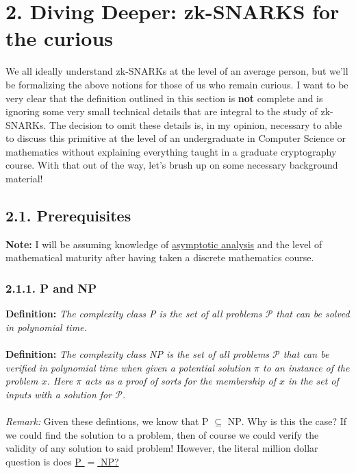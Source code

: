 \documentclass{article}
\begin{document}
\section*{2. Diving Deeper: zk-SNARKS for the curious}
We all ideally understand zk-SNARKs at the level of an average person, but we'll be formalizing the above notions for those of us who remain curious. I want to be very clear that the definition outlined in this section is \textbf{not} complete and is ignoring some very small technical details that are integral to the study of zk-SNARKs. The decision to omit these details is, in my opinion, necessary to able to discuss this primitive at the level of an undergraduate in Computer Science or mathematics without explaining everything taught in a graduate cryptography course. With that out of the way, let's brush up on some necessary background material!
\subsection*{2.1. Prerequisites}
\textbf{Note:} I will be assuming knowledge of \href{https://en.wikipedia.org/wiki/Asymptotic_analysis}{asymptotic analysis} and the level of mathematical maturity after having taken a discrete mathematics course.

\subsubsection*{2.1.1. \textsc{P} and \textsc{NP}}
\textbf{Definition:} \textit{The complexity class \textsc{P} is the set of all problems $\mathcal{P}$ that can be solved in polynomial time.} \\ \\
\textbf{Definition:} \textit{The complexity class \textsc{NP} is the set of all problems $\mathcal{P}$ that can be verified in polynomial time when given a potential solution $\pi$ to an instance of the problem $x$. Here $\pi$ acts as a proof of sorts for the membership of $x$ in the set of inputs with a solution for $\mathcal{P}$.} \\ \\
\noindent \textit{Remark:} Given these defintions, we know that \textsc{P} $\subseteq$ \textsc{NP}. Why is this the case? If we could find the solution to a problem, then of course we could verify the validity of any solution to said problem! However, the literal million dollar question is does \href{https://en.wikipedia.org/wiki/P_versus_NP_problem}{\textsc{P} $=$ \textsc{NP}?}
\end{document}
